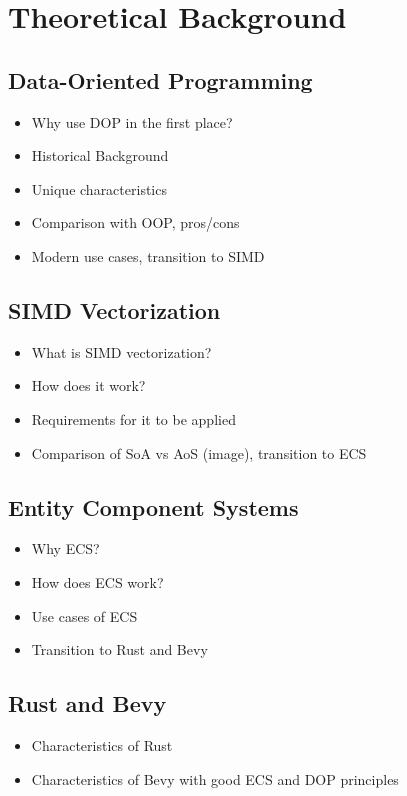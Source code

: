 
\cleardoubleoddpage
\chapter{Theoretical Background}
\label{sec:theoretical-background}



\section{Data-Oriented Programming}
\label{sec:theoretical-background:dop}

\begin{itemize}
    \item Why use DOP in the first place?
    \item Historical Background
    \item Unique characteristics
    \item Comparison with OOP, pros/cons
    \item Modern use cases, transition to SIMD
\end{itemize}



\section{SIMD Vectorization}
\label{sec:theoretical-background:simd}

\begin{itemize}
    \item What is SIMD vectorization?
    \item How does it work?
    \item Requirements for it to be applied
    \item Comparison of SoA vs AoS (image), transition to ECS
\end{itemize}



\section{Entity Component Systems}
\label{sec:theoretical-background:ecs}

\begin{itemize}
    \item Why ECS?
    \item How does ECS work?
    \item Use cases of ECS
    \item Transition to Rust and Bevy
\end{itemize}



\section{Rust and Bevy}
\label{sec:theoretical-background:rustandbevy}

\begin{itemize}
    \item Characteristics of Rust
    \item Characteristics of Bevy with good ECS and DOP principles
\end{itemize}

